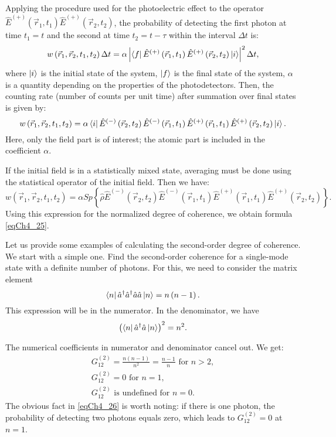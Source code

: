 Applying the procedure used for the photoelectric effect to the operator $\hat{E}^{(+)}\left(\vec{r}_1, t_1\right)\hat{E}^{(+)}\left(\vec{r}_2, t_2\right)$, the probability of detecting the first photon at time $t_1 = t$ and the second at time $t_2 = t - \tau$ within the interval $\Delta t$ is:
\begin{equation}
w\left(\vec{r}_1, \vec{r}_2, t_1, t_2\right) \Delta t= 
\alpha \left| \bra{f}
\hat{E}^{(+)}\left(\vec{r}_1, t_1\right)\hat{E}^{(+)}\left(\vec{r}_2,
t_2\right)
\ket{i}\right|^2 \Delta t,
\nonumber
\end{equation}
where $\ket{i}$ is the initial state of the system, $\ket{f}$ is the final state of the system, $\alpha$ is a quantity depending on the properties of the photodetectors. Then, the counting rate (number of counts per unit time) after summation over final states is given by:
\begin{equation}
w\left(\vec{r}_1, \vec{r}_2, t_1, t_2\right) = 
\alpha \bra{i}
\hat{E}^{(-)}\left(\vec{r}_2, t_2\right)\hat{E}^{(-)}\left(\vec{r}_1,
t_1\right)
\hat{E}^{(+)}\left(\vec{r}_1, t_1\right)\hat{E}^{(+)}\left(\vec{r}_2,
t_2\right)
\ket{i}.
\nonumber
\end{equation}
Here, only the field part is of interest; the atomic part is included in the coefficient $\alpha$.

If the initial field is in a statistically mixed state, averaging must be done using the statistical operator of the initial field. Then we have:
\begin{equation}
w\left(\vec{r}_1, \vec{r}_2, t_1, t_2\right) = 
\alpha Sp \left\{\hat{\rho}
\hat{E}^{(-)}\left(\vec{r}_2, t_2\right)\hat{E}^{(-)}\left(\vec{r}_1,
t_1\right)
\hat{E}^{(+)}\left(\vec{r}_1, t_1\right)\hat{E}^{(+)}\left(\vec{r}_2,
t_2\right)
\right\}.
\nonumber
\end{equation}
Using this expression for the normalized degree of coherence, we obtain formula \eqref{eqCh4_25}.

Let us provide some examples of calculating the second-order degree of coherence. We start with a simple one. Find the second-order coherence for a single-mode state with a definite number of photons. For this, we need to consider the matrix element  
\[
\bra{n}\hat{a}^{\dag}\hat{a}^{\dag}\hat{a}\hat{a}\ket{n} = n
\left(n - 1\right).
\]
This expression will be in the numerator. In the denominator, we have  
\[
\left(\bra{n}\hat{a}^{\dag}\hat{a}\ket{n}\right)^2 = 
n^2.
\]

The numerical coefficients in numerator and denominator cancel out. We get:
\begin{eqnarray}
G^{(2)}_{12} = \frac{n\left(n - 1\right)}{n^2} = \frac{n - 1}{n} 
\mbox{ for } n > 2,
\nonumber \\
G^{(2)}_{12} = 0
\mbox{ for } n = 1,
\nonumber \\
G^{(2)}_{12} 
\mbox{ is undefined for } n = 0.
\label{eqCh4_26}
\end{eqnarray}
The obvious fact in \eqref{eqCh4_26} is worth noting: if there is one photon, the probability of detecting two photons equals zero, which leads to $G^{(2)}_{12} = 0$ at $n=1$.

